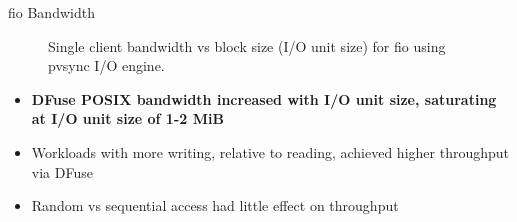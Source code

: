 \documentclass[final]{beamer}
\newlength{\colwidth}
\begin{document}
\begin{frame}[t, fragile]
\begin{columns}[t]
\begin{column}{\colwidth}
\begin{block}{fio Bandwidth}
    \begin{figure}
      \centering
         
      \caption{Single client bandwidth vs block size (I/O unit size) for fio using pvsync I/O engine.}
      \label{fig:fio_bw_vs_bs_hueRW_nj-16_iod-16}
    \end{figure}
    \normalsize{
    \begin{itemize}
      \item \textbf{DFuse POSIX bandwidth increased with I/O unit size, saturating at I/O unit size of 1-2 MiB}
      \item Workloads with more writing, relative to reading, achieved higher throughput via DFuse
      \item Random vs sequential access had little effect on throughput
    \end{itemize}
    }
    


\end{block}
\end{column}
\end{columns}
\end{frame}
\end{document}
